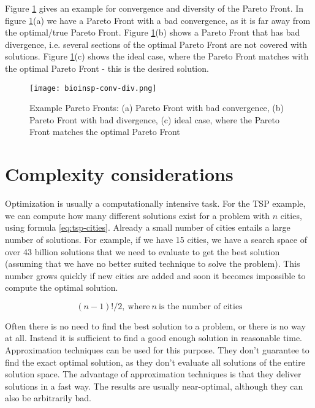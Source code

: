 Figure \ref{fig:conv-div} gives an example for convergence and diversity of the Pareto Front. In figure \ref{fig:conv-div}(a) we have a Pareto Front with a bad convergence, as it is far away from the optimal/true Pareto Front. Figure \ref{fig:conv-div}(b) shows a Pareto Front that has bad divergence, i.e. several sections of the optimal Pareto Front are not covered with solutions. Figure \ref{fig:conv-div}(c) shows the ideal case, where the Pareto Front matches with the optimal Pareto Front - this is the desired solution.

\begin{figure}[ht!]
  \centering
  \texttt{[image: bioinsp-conv-div.png]}
  \caption{Example Pareto Fronts: (a) Pareto Front with bad convergence, (b) Pareto Front with bad divergence, (c) ideal case, where the Pareto Front matches the optimal Pareto Front}
  \label{fig:conv-div}
\end{figure}

\section{Complexity considerations}
Optimization is usually a computationally intensive task. For the TSP example, we can compute how many different solutions exist for a problem with $n$ cities, using formula \eqref{eq:tsp-cities}. Already a small number of cities entails a large number of solutions. For example, if we have 15 cities, we have a search space of over 43 billion solutions that we need to evaluate to get the best solution (assuming that we have no better suited technique to solve the problem). This number grows quickly if new cities are added and soon it becomes impossible to compute the optimal solution.

\begin{equation}\label{eq:tsp-cities}
  (n - 1)! / 2, \ \mbox{where} \ n \ \mbox{is the number of cities}
\end{equation}

Often there is no need to find the best solution to a problem, or there is no way at all. Instead it is sufficient to find a good enough solution in reasonable time. Approximation techniques can be used for this purpose. They don't guarantee to find the exact optimal solution, as they don't evaluate all solutions of the entire solution space. The advantage of approximation techniques is that they deliver solutions in a fast way. The results are usually near-optimal, although they can also be arbitrarily bad.

